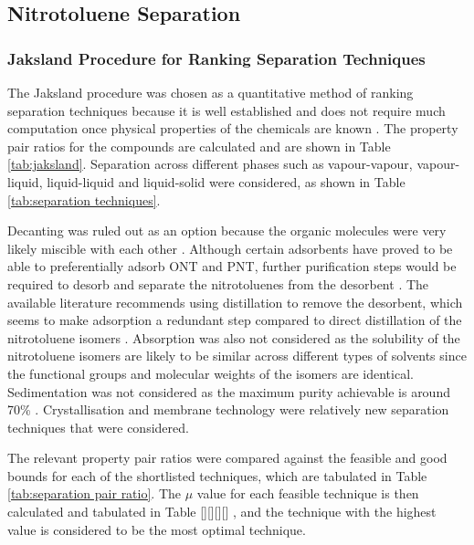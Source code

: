 \subsection{Nitrotoluene Separation}
\label{app:ntol separation}
\subsubsection{Jaksland Procedure for Ranking Separation Techniques}
The Jaksland procedure was chosen as a quantitative method of ranking separation techniques because it is well established and does not require much computation once physical properties of the chemicals are known \cite{jaksland_separation_1995}. The property pair ratios for the compounds are calculated and are shown in Table \ref{tab:jaksland}. Separation across different phases such as vapour-vapour, vapour-liquid, liquid-liquid and liquid-solid were considered, as shown in Table \ref{tab:separation techniques}.

Decanting was ruled out as an option because the organic molecules were very likely miscible with each other \cite{merck_solvent_2021}. Although certain adsorbents have proved to be able to preferentially adsorb ONT and PNT, further purification steps would be required to desorb and separate the nitrotoluenes from the desorbent \cite{zhao_new_2016-1}. The available literature recommends using distillation to remove the desorbent, which seems to make adsorption a redundant step compared to direct distillation of the nitrotoluene isomers \cite{zinnen_ep0181106a2_1984}. Absorption was also not considered as the solubility of the nitrotoluene isomers are likely to be similar across different types of solvents since the functional groups and molecular weights of the isomers are identical. Sedimentation was not considered as the maximum purity achievable is around 70\% \cite{seider_product_2009}. Crystallisation and membrane technology were relatively new separation techniques that were considered. 

The relevant property pair ratios were compared against the feasible and good bounds for each of the shortlisted techniques, which are tabulated in Table \ref{tab:separation pair ratio}. The $\mu$ value for each feasible technique is then calculated and tabulated in Table [][][][] , and the technique with the highest value is considered to be the most optimal technique. 

